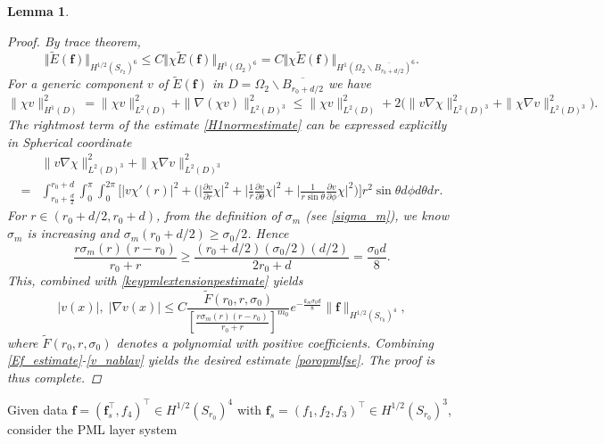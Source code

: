 \documentclass[11pt]{article}
\newcommand{\ba}{\backslash}
\newcommand{\pa}{\partial}
\newcommand{\ov}{\overline}
\newcommand{\Om}{\Omega}
\newcommand{\sig}{\sigma}
\newcommand{\wid}{\widetilde}
\newcommand{\bs}{\boldsymbol}
\newtheorem{lemma}[theorem]{Lemma}
\begin{document}
\begin{lemma}
\begin{proof}
By trace theorem,
\begin{equation}\label{Ef_estimate}
\Vert \wid{E}(\bs{f})\Vert_{ H^{1/2}(S_{r_2})^6}\leq C \Vert\chi \wid{E}(\bs{f})
\Vert_{ H^{1}(\Om_2)^6}=C\Vert\chi \wid{E}(\bs{f})\Vert_{H^1\left(\Om_2\ba\ov{B_{r_0+d/2}}\right)^6}.
\end{equation}
For a generic component $v$ of $\wid{E}(\bs{f})$ in $D=\Om_2\ba\ov{B_{r_0+d/2}}$ we have
\begin{equation}\label{H1normestimate}
\|\chi v\|_{H^1(D)}^2
= \|\chi v\|_{L^2(D)}^2 + \|\nabla(\chi v)\|_{L^2(D)^3}^2
\le \|\chi v\|_{L^2(D)}^2 + 2\bigl(\|v\nabla\chi\|_{L^2(D)^3}^2 + \|\chi\nabla v\|_{L^2(D)^3}^2\bigr).
\end{equation}
The rightmost term of the  estimate \eqref{H1normestimate} can be expressed explicitly in Spherical coordinate
$$
\begin{aligned}
&\|v\nabla\chi\|_{L^2(D)^3}^2 + \|\chi\nabla v\|_{L^2(D)^3}^2\\
=&\int_{r_0+\frac{d}{2}}^{r_0+d}\int_{0}^{\pi}\int_{0}^{2 \pi}
\Bigg[\Big\vert v\chi'(r)\Big\vert^2+\Bigg(\Big\lvert \frac{\pa v }{\pa r}\chi\Big\rvert^2
+\Big\lvert\frac{1}{r} \frac{\pa v }{\pa\theta}\chi\Big\rvert^2+\Big\lvert \frac{1}{r\sin\theta}
\frac{\pa v }{\pa \phi}\chi\Big\rvert^2\Bigg)\Bigg]r^2\sin\theta d\phi d\theta dr.
\end{aligned}$$
For $r\in (r_0+d/2,r_0+d)$,  from the definition of $\sig_m$ (see \eqref{sigma_m}), we know
$\sig_m$ is increasing and $\sig_m(r_0+d/2)\ge \sig_0/2$. Hence
\begin{equation*}
\frac{r\sig_m(r)(r-r_0)}{r_0+r}
\ge \frac{(r_0+d/2)(\sig_0/2)(d/2)}{2r_0+d} = \frac{\sig_0d}{8}.
\end{equation*}
This, combined with \eqref{keypmlextensionpestimate} yields
\begin{equation}\label{v_nablav}
|v(x)|,\; |\nabla v(x)|
\le C\frac{\wid{F}(r_0,r,\sig_0)}{\left[\frac{r\sig_m(r)(r-r_0)}{r_0+r}\right]^{m_0}}
e^{-\frac{k_m\sig_0d}{8}}
\|\bs{f}\|_{H^{1/2}(S_{r_0})^4},
\end{equation}
where $\wid{F}(r_0,r,\sig_0)$ denotes a polynomial with positive coefficients.
Combining \eqref{Ef_estimate}-\eqref{v_nablav} yields the desired estimate \eqref{poropmlfse}. 
The proof is thus complete.
\end{proof}
\end{lemma}
Given data $\bs{f}=(\bs{f}_s^{\top},f_4)^{\top}\in H^{1/2}(S_{r_0})^4$ with 
$\bs{f}_s=(f_1,f_2,f_3)^{\top}\in H^{1/2}(S_{r_0})^3$, consider the PML layer system
\end{document}
